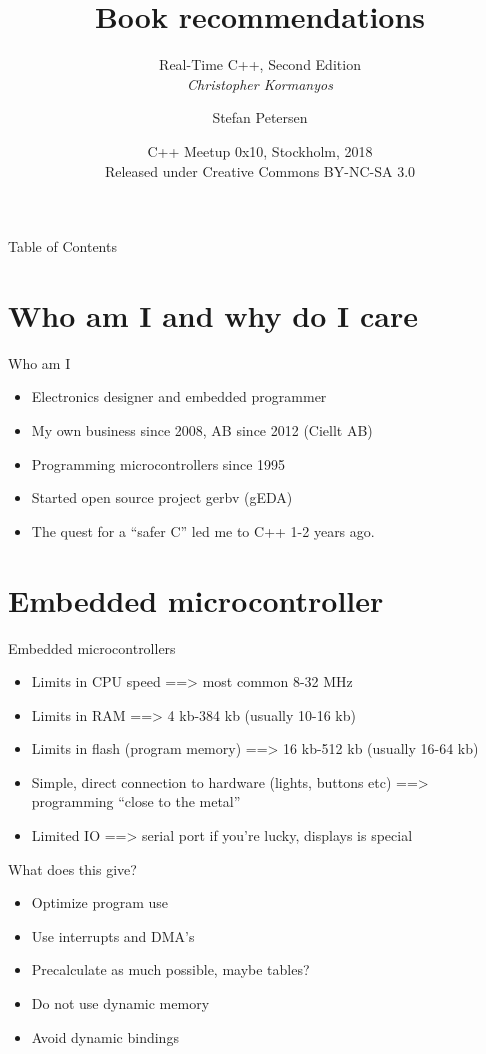 \documentclass{beamer}
\title{Book recommendations }
\subtitle{Real-Time C++, Second Edition \\ \emph{Christopher Kormanyos}}
\author{Stefan Petersen}
\date[2018-10-25]{C++ Meetup 0x10, Stockholm, 2018 \\
  Released under Creative Commons BY-NC-SA 3.0 \\
  \cc \byncsa}
\begin{document}
\begin{frame}
  \titlepage
\end{frame}
\begin{frame}{Table of Contents}
  \tableofcontents
\end{frame}
\section{Who am I and why do I care}
\begin{frame}{Who am I }
  \begin{itemize}
  \item Electronics designer and embedded programmer
  \item My own business since 2008, AB since 2012 (Ciellt AB)
  \item Programming microcontrollers since 1995
  \item Started open source project gerbv (gEDA)
  \item The quest for a ``safer C'' led me to C++ 1-2 years ago.
  \end{itemize}
\end{frame}

\section{Embedded microcontroller}

\begin{frame}{Embedded microcontrollers}
  \begin{itemize}
  \item  Limits in CPU speed
    \pause ==> most common 8-32 MHz
    \pause \item Limits in RAM
    \pause ==> 4 kb-384 kb (usually 10-16 kb)
    \pause \item Limits in flash (program memory)
    \pause ==> 16 kb-512 kb (usually 16-64 kb)
    \pause \item Simple, direct connection to hardware (lights, buttons etc)
    \pause ==> programming ``close to the metal''
    \pause \item Limited IO
    \pause ==> serial port if you're lucky, displays is special
  \end{itemize}
\end{frame}

\begin{frame}{What does this give?}
  \begin{itemize}
  \item Optimize program use
    \pause \item Use interrupts and DMA's
    \pause \item Precalculate as much possible, maybe tables?
    \pause \item Do not use dynamic memory
    \pause \item Avoid dynamic bindings
  \end{itemize}
\end{frame}
\end{document}

